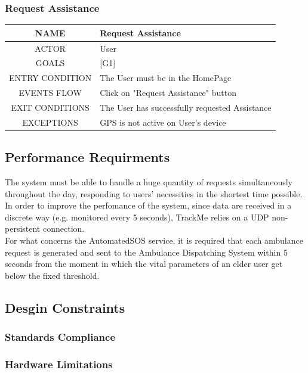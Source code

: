 \documentclass[12pt,a4paper]{article}
\begin{document}
	\subsubsection{Request Assistance}
	\begin{center}
		\begin{tabular}{| c | l |}
			\hline
			NAME & Request Assistance \\
			\hline
			ACTOR & User \\
			\hline
			GOALS & [G1] \\
			\hline
			ENTRY CONDITION & The User must be in the HomePage \\ \hline
			EVENTS FLOW  &
			Click on "Request Assistance" button\\
			\hline
			EXIT CONDITIONS  & The User has successfully requested Assistance \\ \hline
			EXCEPTIONS & 
			GPS is not active on User's device\\
			\hline
		\end{tabular}
	\end{center}
	
	
	\subsection{Performance Requirments}
	The system must be able to handle a huge quantity of requests simultaneously throughout the day, responding to users' necessities in the shortest time possible. In order to improve the perfomance of the system, since data are received in a discrete way (e.g. monitored every 5 seconds), TrackMe relies on a UDP non-persistent connection.\\
	For what concerns the AutomatedSOS service, it is required that each ambulance request is generated and sent to the Ambulance Dispatching System within 5 seconds from the moment in which the vital parameters of an elder user get below the fixed threshold.
	
	\subsection{Desgin Constraints}
	\subsubsection{Standards Compliance}
	\subsubsection{Hardware Limitations}
\end{document}
